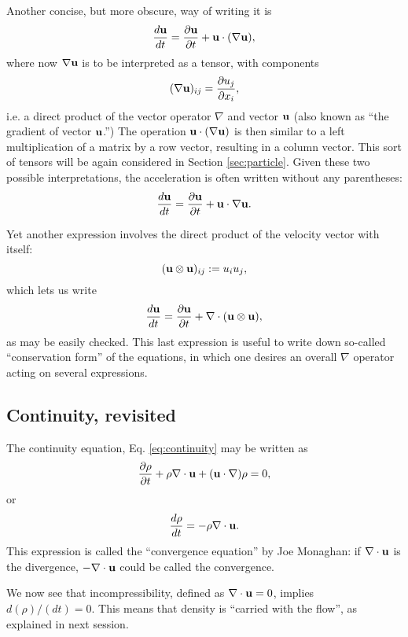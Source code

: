 Another concise, but more obscure, way of writing it is
\[
\frac{d \mathbf{u}  }{dt} =
\frac{\partial \mathbf{u} }{\partial t} +
\mathbf{u} \cdot  ( \nabla  \mathbf{u} ) ,
\]
where now $\nabla  \mathbf{u}$ is to be interpreted as a tensor, with
components
\begin{equation}
  \label{eq:nabla_u_def}
  (\nabla  \mathbf{u})_{ij} = \frac{\partial u_j}{\partial x_i} ,
\end{equation}
i.e. a direct product of the vector operator $\nabla$ and vector
$\mathbf{u}$ (also known as ``the gradient of vector $\mathbf{u}$.'') The
operation $\mathbf{u} \cdot ( \nabla \mathbf{u} )$ is then similar to a left
multiplication of a matrix by a row vector, resulting in a column
vector. This sort of tensors will be again considered in Section
\ref{sec:particle}.  Given these two possible interpretations, the
acceleration is often written without any parentheses:
\[
\frac{d \mathbf{u}  }{dt} =
\frac{\partial \mathbf{u} }{\partial t} +
\mathbf{u} \cdot  \nabla  \mathbf{u} .
\]


Yet another expression involves the direct product of the velocity
vector with itself:
\[
( \mathbf{u} \otimes \mathbf{u} )_{ij} := u_i u_j ,
\]
which lets us write
\begin{equation}
  \label{eq:Euler_uu}
    \frac{d \mathbf{u}  }{dt} =
    \frac{\partial \mathbf{u} }{\partial t} +
    \nabla \cdot ( \mathbf{u} \otimes \mathbf{u} ),  
\end{equation}
as may be easily checked. This last expression is useful to write down
so-called ``conservation form'' of the equations, in which one desires
an overall $\nabla$ operator acting on several expressions.


\subsection{Continuity, revisited}
\label{sec:continuity2}

The continuity equation, Eq. \ref{eq:continuity} may be written as
\[
\frac{\partial \rho }{\partial t} +
\rho \nabla \cdot \mathbf{u} +
(\mathbf{u} \cdot \nabla) \rho = 0 ,
\]
or
%
\begin{equation}
  \label{eq:convergence}
  \frac{d \rho }{d t} = 
  - \rho \nabla  \cdot \mathbf{u} .
\end{equation}
This expression is called the ``convergence equation'' by Joe
Monaghan: if $\nabla \cdot \mathbf{u} $ is the divergence,
$ - \nabla \cdot \mathbf{u} $ could be called the convergence.

We now see that incompressibility, defined as $\nabla \cdot \mathbf{u} = 0
$, implies $d(\rho)/(dt) = 0$. This means that density is ``carried
with the flow'', as explained in next session.

